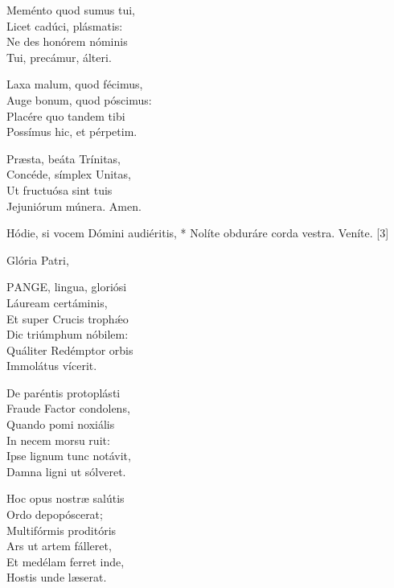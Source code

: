 Meménto quod sumus tui,\\
Licet cadúci, plásmatis:\\
Ne des honórem nóminis\\
Tui, precámur, álteri.

Laxa malum, quod fécimus,\\
Auge bonum, quod póscimus:\\
Placére quo tandem tibi\\
Possímus hic, et pérpetim.


Præsta, beáta Trínitas,\\
Concéde, símplex Unitas,\\
Ut fructuósa sint tuis\\
Jejuniórum múnera. Amen.


 Hódie, si vocem Dómini audiéritis, * Nolíte obduráre corda vestra.  Veníte. [3]


 Glória Patri, 


\lettrine[lines=2]{P}{ANGE}, lingua, gloriósi\\
Láuream certáminis,\\
Et super Crucis trophǽo\\
Dic triúmphum nóbilem:\\
Quáliter Redémptor orbis\\
Immolátus vícerit.

De paréntis protoplásti\\
Fraude Factor condolens,\\
Quando pomi noxiális\\
In necem morsu ruit:\\
Ipse lignum tunc notávit,\\
Damna ligni ut sólveret.

Hoc opus nostræ salútis\\
Ordo depopóscerat;\\
Multifórmis proditóris\\
Ars ut artem fálleret,\\
Et medélam ferret inde,\\
Hostis unde læserat.

